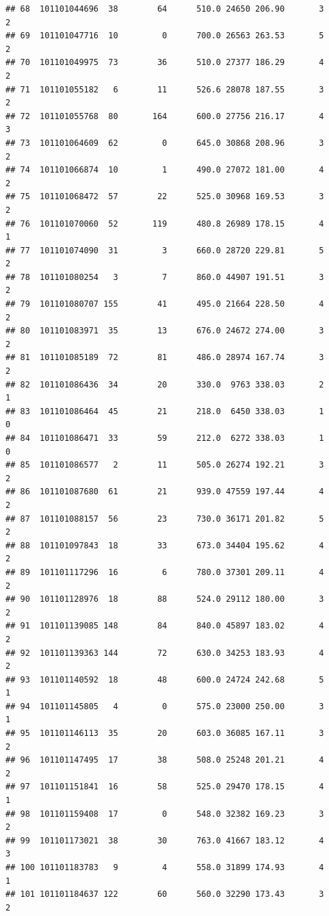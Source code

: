\documentclass[
]{article}
\begin{document}
\begin{verbatim}
## 68  101101044696  38        64      510.0 24650 206.90       3          2
## 69  101101047716  10         0      700.0 26563 263.53       5          2
## 70  101101049975  73        36      510.0 27377 186.29       4          2
## 71  101101055182   6        11      526.6 28078 187.55       3          2
## 72  101101055768  80       164      600.0 27756 216.17       4          3
## 73  101101064609  62         0      645.0 30868 208.96       3          2
## 74  101101066874  10         1      490.0 27072 181.00       4          2
## 75  101101068472  57        22      525.0 30968 169.53       3          2
## 76  101101070060  52       119      480.8 26989 178.15       4          1
## 77  101101074090  31         3      660.0 28720 229.81       5          2
## 78  101101080254   3         7      860.0 44907 191.51       3          2
## 79  101101080707 155        41      495.0 21664 228.50       4          2
## 80  101101083971  35        13      676.0 24672 274.00       3          2
## 81  101101085189  72        81      486.0 28974 167.74       3          2
## 82  101101086436  34        20      330.0  9763 338.03       2          1
## 83  101101086464  45        21      218.0  6450 338.03       1          0
## 84  101101086471  33        59      212.0  6272 338.03       1          0
## 85  101101086577   2        11      505.0 26274 192.21       3          2
## 86  101101087680  61        21      939.0 47559 197.44       4          2
## 87  101101088157  56        23      730.0 36171 201.82       5          2
## 88  101101097843  18        33      673.0 34404 195.62       4          2
## 89  101101117296  16         6      780.0 37301 209.11       4          2
## 90  101101128976  18        88      524.0 29112 180.00       3          2
## 91  101101139085 148        84      840.0 45897 183.02       4          2
## 92  101101139363 144        72      630.0 34253 183.93       4          2
## 93  101101140592  18        48      600.0 24724 242.68       5          1
## 94  101101145805   4         0      575.0 23000 250.00       3          1
## 95  101101146113  35        20      603.0 36085 167.11       3          2
## 96  101101147495  17        38      508.0 25248 201.21       4          2
## 97  101101151841  16        58      525.0 29470 178.15       4          1
## 98  101101159408  17         0      548.0 32382 169.23       3          2
## 99  101101173021  38        30      763.0 41667 183.12       4          3
## 100 101101183783   9         4      558.0 31899 174.93       4          1
## 101 101101184637 122        60      560.0 32290 173.43       3          2

\end{verbatim}
\end{document}
